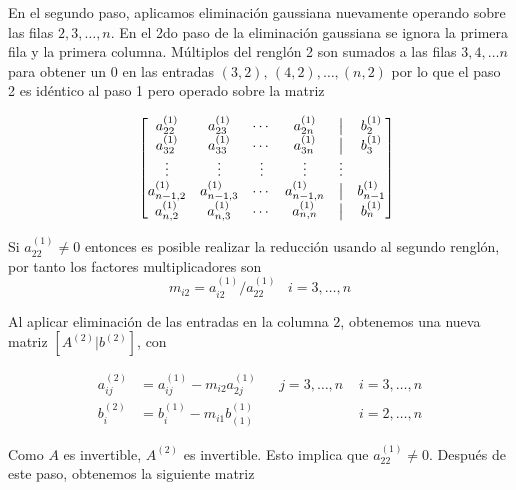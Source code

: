 \documentclass[
]{article}
\begin{document}
En el segundo paso, aplicamos eliminación gaussiana nuevamente operando
sobre las filas \(2,3,\ldots,n\). En el 2do paso de la eliminación
gaussiana se ignora la primera fila y la primera columna. Múltiplos del
renglón 2 son sumados a las filas \(3,4,\ldots n\) para obtener un \(0\)
en las entradas \((3,2),\,(4,2),\ldots,(n,2)\) por lo que el paso 2 es
idéntico al paso 1 pero operado sobre la matriz

\begin{equation}
\begin{array}{cc}
 &  \begin{bmatrix} 
      a^{(1)}_{22}      & a^{(1)}_{23}     & \cdots & a^{(1)}_{2n}  & \bigm|  &b_2^{(1)}\\
      a^{(1)}_{32}      & a^{(1)}_{33}     & \cdots & a^{(1)}_{3n}  & \bigm|  &b_3^{(1)}\\
     \vdots             & \vdots           & \vdots & \vdots        & \vdots  &\\
    a^{(1)}_{n-1,2}     & a^{(1)}_{n-1,3}  & \cdots & a^{(1)}_{n-1,n}& \bigm| & b_{n-1}^{(1)}\\
     a^{(1)}_{n,2}      & a^{(1)}_{n,3}    & \cdots & a^{(1)}_{n,n} & \bigm|  &b_{n}^{(1)}\\
  \end{bmatrix}
\end{array}
\end{equation}

Si \(a_{22}^{(1)} \ne 0\) entonces es posible realizar la reducción
usando al segundo renglón, por tanto los factores multiplicadores son
\begin{equation}
m_{i2} = a^{(1)}_{i2}/a^{(1)}_{22}\,\,\,\,\,i=3,\ldots,n
\end{equation}

Al aplicar eliminación de las entradas en la columna \(2\), obtenemos
una nueva matriz \([A^{(2)}|b^{(2)}]\), con

\begin{equation}
\begin{array}{ccccc}
a^{(2)}_{ij} & = a^{(1)}_{ij} - m_{i2}a^{(1)}_{2j}& & j=3,\ldots,n\,\,& i=3,\ldots,n\\
b^{(2)}_{i}  & = b^{(1)}_{i}  - m_{i1}b_{(1)}^{(1)} & & \,\               & i=2,\ldots,n
\end{array}
\end{equation}

Como \(A\) es invertible, \(A^{(2)}\) es invertible. Esto implica que
\(a_{22}^{(1)} \ne 0\). Después de este paso, obtenemos la siguiente
matriz
\end{document}
